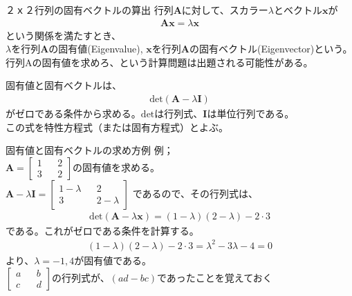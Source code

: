 \documentclass[dvipdfmx,autodetect-engine, unicode, 10pt, aspectratio=169]{beamer}
\begin{document}
\begin{frame}{２ｘ２行列の固有ベクトルの算出}
    行列$\bm{A}$に対して、スカラー$\lambda$とベクトル$\bm{x}$が
    \begin{align*}
        \bm{A}\bm{x} = \lambda \bm{x}
    \end{align*}
    という関係を満たすとき、\\
    $\lambda$を行列$\bm{A}$の固有値(Eigenvalue), $\bm{x}$を行列$\bm{A}$の固有ベクトル(Eigenvector)という。\\
    行列Aの固有値を求めろ、という計算問題は出題される可能性がある。\\
    \vspace{5pt}

    固有値と固有ベクトルは、
    \begin{align*}
        \text{det}(\bm{A} - \lambda \bm{I})
    \end{align*}
    がゼロである条件から求める。$\text{det}$は行列式、$\bm{I}$は単位行列である。 \\
    この式を特性方程式（または固有方程式）とよぶ。
\end{frame}


\begin{frame}{固有値と固有ベクトルの求め方例}
    例；\\
    $\bm{A} =
        \begin{bmatrix}
            1 && 2 \\
            3 && 2
        \end{bmatrix}
    $の固有値を求める。\\
    $
    \bm{A} - \lambda \bm{I} = 
    \begin{bmatrix}
        1-\lambda && 2 \\
        3 && 2 - \lambda 
    \end{bmatrix}
    $
    であるので、その行列式は、
    \begin{align*}
        \text{det}(\bm{A} - \lambda \bm{x}) = (1-\lambda)(2-\lambda) - 2\cdot 3
    \end{align*}
    である。これがゼロである条件を計算する。  
    \begin{align*}
        (1-\lambda)(2-\lambda) - 2\cdot3 = \lambda^2 - 3\lambda - 4 = 0
    \end{align*}
    より、$\lambda = -1, 4$が固有値である。\\
    \vspace{5pt}
\scriptsize $\begin{bmatrix}
        a && b \\
        c && d
    \end{bmatrix}$の行列式が、$(ad-bc)$であったことを覚えておく
\end{frame}
\end{document}
